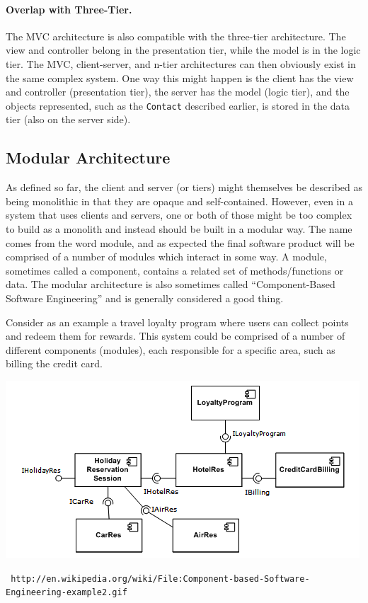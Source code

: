 \paragraph{Overlap with Three-Tier.} The MVC architecture is also compatible with the three-tier architecture. The view and controller belong in the presentation tier, while the model is in the logic tier. The MVC, client-server, and n-tier architectures can then obviously exist in the same complex system. One way this might happen is the client has the view and controller (presentation tier), the server has the model (logic tier), and the objects represented, such as the \texttt{Contact} described earlier, is stored in the data tier (also on the server side).


\subsection*{Modular Architecture} 
As defined so far, the client and server (or tiers) might themselves be described as being monolithic in that they are opaque and self-contained. However, even in a system that uses clients and servers, one or both of those might be too complex to build as a monolith and instead should be built in a modular way. The name comes from the word module, and as expected the final software product will be comprised of a number of modules which interact in some way. A module, sometimes called a component, contains a related set of methods/functions or data.  The modular architecture is also sometimes called ``Component-Based Software Engineering'' and is generally considered a good thing. 

Consider as an example a travel loyalty program where users can collect points and redeem them for rewards. This system could be comprised of a number of different components (modules), each responsible for a specific area, such as billing the credit card.

\begin{center}
	\includegraphics{images/cbse.png}
	
	\texttt{\small
http://en.wikipedia.org/wiki/File:Component-based-Software-Engineering-example2.gif}
\end{center}

